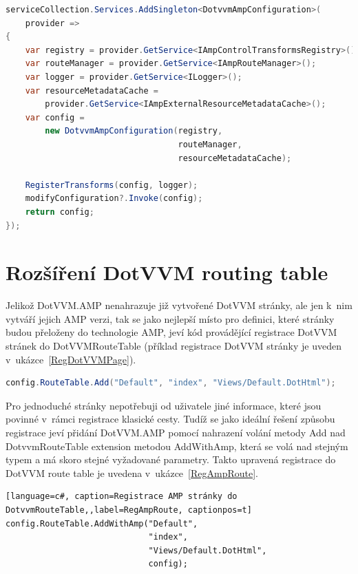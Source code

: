 \begin{lstlisting}[language=c#, caption=Registrace DotvvmAmpConfiguration,label=RegAmpConfig,captionpos=t]
serviceCollection.Services.AddSingleton<DotvvmAmpConfiguration>(
    provider =>
{
    var registry = provider.GetService<IAmpControlTransformsRegistry>();
    var routeManager = provider.GetService<IAmpRouteManager>();
    var logger = provider.GetService<ILogger>();
    var resourceMetadataCache =
        provider.GetService<IAmpExternalResourceMetadataCache>();
    var config =
        new DotvvmAmpConfiguration(registry,
                                   routeManager,
                                   resourceMetadataCache);
        
    RegisterTransforms(config, logger);
    modifyConfiguration?.Invoke(config);
    return config;
});
\end{lstlisting}
\section{Rozšíření DotVVM routing table}
Jelikož DotVVM.AMP nenahrazuje již vytvořené DotVVM stránky, ale jen k~nim vytváří jejich AMP verzi, tak se jako nejlepší místo pro definici, které stránky budou přeloženy do technologie AMP, jeví kód provádějící registrace DotVVM stránek do DotVVMRouteTable (příklad registrace DotVVM stránky je uveden v~ukázce~\ref{RegDotVVMPage}).

\begin{lstlisting}[language=c#, caption=Registrace DotVVM stránky do DotvvmRouteTable,label=RegDotVVMPage,captionpos=t]
config.RouteTable.Add("Default", "index", "Views/Default.DotHtml");
\end{lstlisting}

\pagebreak
Pro jednoduché stránky nepotřebuji od uživatele jiné informace, které jsou povinné v~rámci registrace klasické cesty.
Tudíž se jako ideální řešení způsobu registrace jeví přidání DotVVM.AMP pomocí nahrazení volání metody Add nad DotvvmRouteTable extension metodou AddWithAmp, která se volá nad stejným typem a má skoro stejné vyžadované parametry. Takto upravená registrace do DotVVM route table je uvedena v~ukázce~\ref{RegAmpRoute}.

\begin{lstlisting}[language=c#, caption=Registrace AMP stránky do DotvvmRouteTable,,label=RegAmpRoute, captionpos=t]
config.RouteTable.AddWithAmp("Default",
                             "index",
                             "Views/Default.DotHtml",
                             config);
\end{lstlisting}

